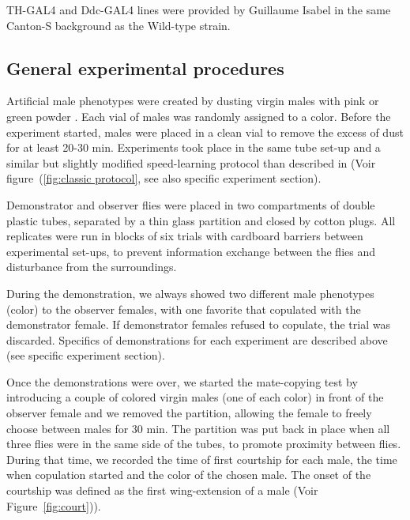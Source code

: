 \documentclass[a4paper, 12pt]{article}
\begin{document}
	TH-GAL4 and Ddc-GAL4 lines were provided by Guillaume Isabel in the same Canton-S background as the Wild-type strain.
	
	\subsection{General experimental procedures}
	
	Artificial male phenotypes were created by dusting virgin males with pink or green powder \parencite{mery_public_2009}. Each vial of males was randomly assigned to a color. Before the experiment started, males were placed in a clean vial to remove the excess of dust for at least 20-30 min. Experiments took place in the same tube set-up and a similar but slightly modified speed-learning protocol than described in \textcite{dagaeff_drosophila_2016} (Voir figure~(\ref{fig:classic protocol}, see also specific experiment section).
	
	Demonstrator and observer flies were placed in two compartments of double plastic tubes, separated by a thin glass partition and closed by cotton plugs. All replicates were run in blocks of six trials with cardboard barriers between experimental set-ups, to prevent information exchange between the flies and disturbance from the surroundings. 
	
	During the demonstration, we always showed two different male phenotypes (color) to the observer females, with one favorite that copulated with the demonstrator female. If demonstrator females refused to copulate, the trial was discarded. Specifics of demonstrations for each experiment are described above (see specific experiment section).
	
	Once the demonstrations were over, we started the mate-copying test by introducing a couple of colored virgin males (one of each color) in front of the observer female and we removed the partition, allowing the female to freely choose between males for 30 min. The partition was put back in place when all three flies were in the same side of the tubes, to promote proximity between flies. During that time, we recorded the time of first courtship for each male, the time when copulation started and the color of the chosen male. The onset of the courtship was defined as the first wing-extension of a male (Voir Figure~\ref{fig:court})).
	
	
	
	
	
\end{document}
